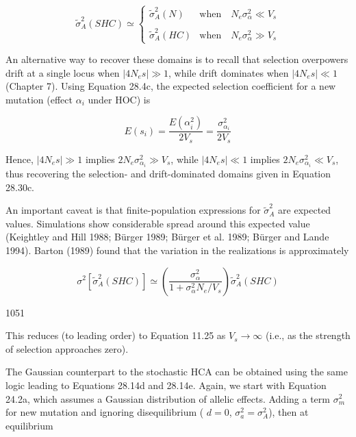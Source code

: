 \documentclass{article}
\begin{document}
\begin{equation}
\widetilde{\sigma}_{A}^{2}(SHC)\simeq\left\{\begin{array}{ll}\widetilde{\sigma}_{A}^{2}(N)&\text{when}\quad N_{e}\sigma_{\alpha}^{2}\ll V_{s}\\ \\ \widetilde{\sigma}_{A}^{2}(HC)&\text{when}\quad N_{e}\sigma_{\alpha}^{2}\gg V_{s}\end{array}\right.
\tag{28.30c}
\label{eq:28_30c}
\end{equation}

An alternative way to recover these domains is to recall that selection overpowers drift at a single locus when  $ |4N_e s| \gg 1 $, while drift dominates when  $ |4N_e s| \ll 1 $ (Chapter 7). Using Equation 28.4c, the expected selection coefficient for a new mutation (effect  $ \alpha_i $ under HOC) is

\begin{equation}
E(s_{i})=\frac{E(\alpha_{i}^{2})}{2V_{s}}=\frac{\sigma_{\alpha_{i}}^{2}}{2V_{s}}
\tag{28.30d}
\label{eq:28_30d}
\end{equation}

Hence,  $ |4N_e s| \gg 1 $ implies  $ 2N_e \sigma_{\alpha_i}^2 \gg V_s $, while  $ |4N_e s| \ll 1 $ implies  $ 2N_e \sigma_{\alpha_i}^2 \ll V_s $, thus recovering the selection- and drift-dominated domains given in Equation 28.30c.

An important caveat is that finite-population expressions for  $ \widetilde{\sigma}_{A}^{2} $ are expected values. Simulations show considerable spread around this expected value (Keightley and Hill 1988; Bürger 1989; Bürger et al. 1989; Bürger and Lande 1994). Barton (1989) found that the variation in the realizations is approximately

\begin{equation}
\sigma^{2}\left[\widetilde{\sigma}_{A}^{2}(SHC)\right]\simeq\left(\frac{\sigma_{\alpha}^{2}}{1+\sigma_{\alpha}^{2}N_{e}/V_{s}}\right)\widetilde{\sigma}_{A}^{2}(SHC)
\tag{28.31}
\label{eq:28_31}
\end{equation}

1051

This reduces (to leading order) to Equation 11.25 as  $ V_s \to \infty $ (i.e., as the strength of selection approaches zero).

The Gaussian counterpart to the stochastic HCA can be obtained using the same logic leading to Equations 28.14d and 28.14e. Again, we start with Equation 24.2a, which assumes a Gaussian distribution of allelic effects. Adding a term  $ \sigma_m^2 $ for new mutation and ignoring disequilibrium ( $ d = 0 $,  $ \sigma_a^2 = \sigma_A^2 $), then at equilibrium
\end{document}
